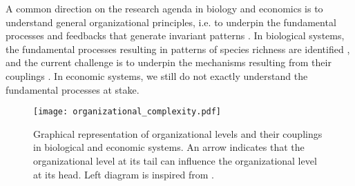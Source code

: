 % 
A common direction on the research agenda in biology and economics is to understand general organizational principles, i.e.  to underpin the fundamental processes and feedbacks that generate invariant patterns \citep{Levin2002,Olff2009,Veldhuis2018}.
% 
In biological systems, the fundamental processes resulting in patterns of species richness are identified \citep{Rahbek2019a,Rangel2018,Hagen2022}, and the current challenge is to underpin the mechanisms resulting from their couplings \citep{Hagen2022}.
% 
In economic systems, we still do not exactly understand the fundamental processes at stake. 
% 
% 
% 

\begin{figure}[ht]
    \centering
    \texttt{[image: organizational\_complexity.pdf]}
\caption{Graphical representation of organizational levels and their couplings in biological and economic systems. An arrow indicates that the organizational level at its tail can influence the organizational level at its head. Left diagram is inspired from \cite{Hendry+2016}.}
\label{fig:organisational_levels}
\end{figure}





